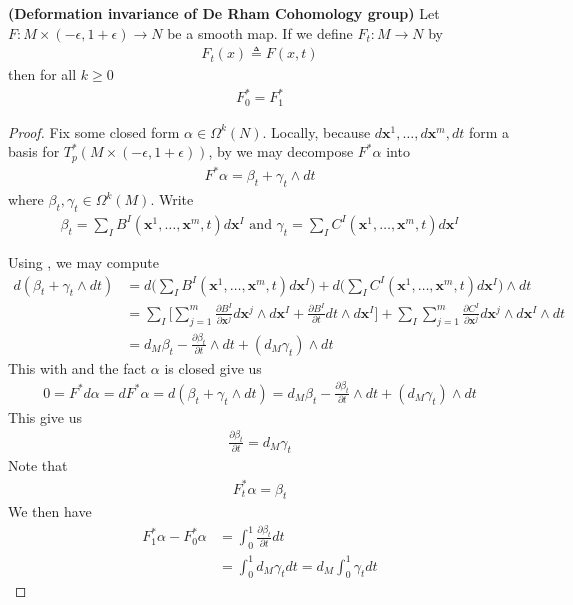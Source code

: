 \documentclass{report}
\begin{document}
\begin{theorem}
\label{PPL}
\textbf{(Deformation invariance of De Rham Cohomology group)} Let $F:M\times  (-\epsilon  ,1+\epsilon )\rightarrow N$ be a smooth map. If we define $F_t:M\rightarrow N$ by 
\begin{align*}
F_t(x)\triangleq F(x,t)
\end{align*}
then for all $k\geq 0$
\begin{align*}
F_0^*=F_1^*
\end{align*}
\end{theorem}
\begin{proof}
Fix some closed form $\alpha \in \Omega^k(N)$. Locally, because $d\textbf{x}^1,\dots ,d\textbf{x}^m,dt$ form a basis for $T_p^*(M\times (-\epsilon , 1+\epsilon ) )$, by  we may decompose $F^* \alpha $ into 
\begin{align*}
F^* \alpha  = \beta_t + \gamma_t \wedge  dt 
\end{align*}
where $\beta _t,\gamma _t\in \Omega^k (M)$. Write 
\begin{align*}
\beta _t= \sum_I B^I (\textbf{x}^1,\dots ,\textbf{x}^m,t)d\textbf{x}^I \text{ and } \gamma _t= \sum_I C^I (\textbf{x}^1,\dots ,\textbf{x}^m,t)d\textbf{x}^I
\end{align*}

Using , we may compute 
\begin{align*}
d(\beta _t + \gamma_t \wedge  dt )&=  d\Big( \sum_I B^I(\textbf{x}^1,\dots ,\textbf{x}^m,t)d\textbf{x}^I \Big) + d \Big(\sum_I C^I (\textbf{x}^1,\dots ,\textbf{x}^m,t)d\textbf{x}^I \Big) \wedge  dt  \\
&= \sum_I \Big[\sum_{j=1}^m \frac{ \partial B^I}{\partial \textbf{x}^j} d\textbf{x}^j \wedge    d\textbf{x}^I + \frac{\partial B^I}{\partial t}dt \wedge  d\textbf{x}^I    \Big] + \sum_I \sum_{j=1}^m \frac{\partial C^I}{\partial \textbf{x}^j}d\textbf{x}^j \wedge  d\textbf{x}^I \wedge  dt   \\
&= d_M \beta_t - \frac{\partial \beta _t}{\partial t} \wedge  dt+  (d_M \gamma_t) \wedge  dt 
\end{align*}
This with  and the fact $\alpha $ is closed give us 
\begin{align*}
0=F^* d\alpha =dF^* \alpha = d(\beta _t + \gamma_t \wedge  dt ) =d_M\beta_t - \frac{\partial \beta _t}{\partial t}\wedge  dt + (d_M \gamma _t )\wedge  dt   
\end{align*}
This give us 
\begin{align*}
\frac{\partial \beta _t}{\partial t}= d_M \gamma_t
\end{align*}
Note that 
\begin{align*}
  F_t^* \alpha = \beta _t
\end{align*}
We then have 
\begin{align*}
  F_1^* \alpha -F_0^{*}\alpha &= \int_0^1 \frac{\partial \beta_t }{\partial t}dt \\
  &=\int_0^1 d_M \gamma_t dt =d_M \int_0^1 \gamma_t dt
\end{align*}
\end{proof}
\end{document}
